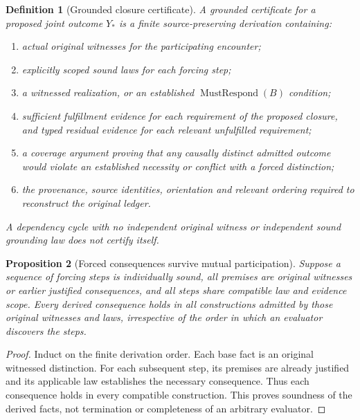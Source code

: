 \documentclass[11pt]{article}
\newtheorem{definition}{Definition}[section]
\newtheorem{proposition}[definition]{Proposition}
\begin{document}
\begin{definition}[Grounded closure certificate]
A grounded certificate for a proposed joint outcome $Y_*$ is
a finite source-preserving derivation containing:
\begin{enumerate}[label=(\alph*)]
\item actual original witnesses for the participating encounter;
\item explicitly scoped sound laws for each forcing step;
\item a witnessed realization, or an established
$\operatorname{MustRespond}(B)$ condition;
\item sufficient fulfillment evidence for each requirement
of the proposed closure, and typed residual evidence for
each relevant unfulfilled requirement;
\item a coverage argument proving that any causally distinct
admitted outcome would violate an established necessity
or conflict with a forced distinction;
\item the provenance, source identities, orientation and
relevant ordering required to reconstruct the original ledger.
\end{enumerate}
A dependency cycle with no independent original witness or
independent sound grounding law does not certify itself.
\end{definition}

\begin{proposition}[Forced consequences survive mutual participation]
Suppose a sequence of forcing steps is individually sound,
all premises are original witnesses or earlier justified
consequences, and all steps share compatible law and evidence
scope. Every derived consequence holds in all constructions
admitted by those original witnesses and laws, irrespective
of the order in which an evaluator discovers the steps.
\end{proposition}
\begin{proof}
Induct on the finite derivation order. Each base fact is an
original witnessed distinction. For each subsequent step,
its premises are already justified and its applicable
law establishes the necessary consequence. Thus each
consequence holds in every compatible construction.
This proves soundness of the derived facts, not termination
or completeness of an arbitrary evaluator.
\end{proof}
\end{document}
